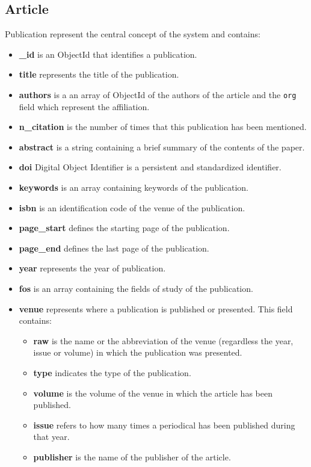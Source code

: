 \documentclass{Configuration_Files/PoliMi3i_thesis}
\begin{document}
\subsection{Article}
Publication represent the central concept of the system and contains:
\begin{itemize}
\item \textbf{\_id} is an ObjectId that identifies a publication.
\item \textbf{title} represents the title of the publication.
\item \textbf{authors} is a an array of ObjectId of the authors of the article and the \verb |org| field which represent
	the affiliation.
\item \textbf{n\_citation} is the number of times that this publication has been mentioned.
\item \textbf{abstract} is a string containing a brief summary of the contents of the paper.
\item \textbf{doi} Digital Object Identifier is a persistent and standardized identifier.
\item \textbf{keywords} is an array containing keywords of the publication.
\item \textbf{isbn} is an identification code of the venue of the publication.
\item \textbf{page\_start} defines the starting page of the publication.
\item \textbf{page\_end} defines the last page of the publication.
\item \textbf{year} represents the year of publication.
\item \textbf{fos} is an array containing the fields of study of the publication.
\item \textbf{venue} represents where a publication is published or presented. This field contains:
				\begin{itemize}
					\item \textbf{raw} is the name or the abbreviation of the venue (regardless the year, issue or volume) in which the
						publication was presented.
					\item \textbf{type} indicates the type of the publication.
					\item \textbf{volume} is the volume of the venue in which the article has been published.
					\item \textbf{issue} refers to how many times a periodical has been published during that year.
					\item \textbf{publisher} is the name of the publisher of the article.

\end{itemize}
\end{itemize}
\end{document}
